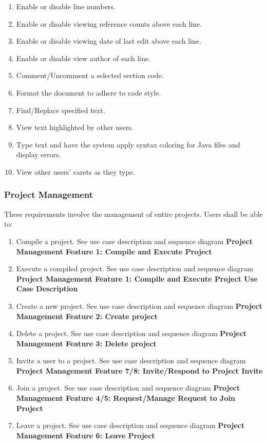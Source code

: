 \documentclass[twoside,letterpaper]{article}
\begin{document}
{\begin{enumerate}
	\item Enable or disable line numbers.
	\item Enable or disable viewing reference counts above each line.
	\item Enable or disable viewing date of last edit above each line.
	\item Enable or disable view author of each line.
	\item Comment/Uncomment a selected section code.
	\item Format the document to adhere to code style.
	\item Find/Replace specified text.
	\item View text highlighted by other users.
	\item Type text and have the system apply syntax coloring for Java files and display errors.
	\item View other users' carets as they type.
\end{enumerate}

\subsubsection{Project Management}

These requirements involve the management of entire projects. Users shall be able to:

\begin{enumerate}
	\item Compile a project.  See use case description and sequence diagram \textbf{Project Management Feature 1: Compile and Execute Project}
	\item Execute a compiled project. See use case description and sequence diagram \textbf{Project Management Feature 1: Compile and Execute Project Use Case Description}
	\item Create a new project. See use case description and sequence diagram \textbf{Project Management Feature 2: Create project}
	\item Delete a project. See use case description and sequence diagram \textbf{Project Management Feature 3: Delete project}
	\item Invite a user to a project. See use case description and sequence diagram \textbf{Project Management Feature 7/8: Invite/Respond to Project Invite}
	\item Join a project. See use case description and sequence diagram \textbf{Project Management Feature 4/5: Request/Manage Request to Join Project}
	\item Leave a project. See use case description and sequence diagram \textbf{Project Management Feature 6: Leave Project}
\end{enumerate}

}
\end{document}
